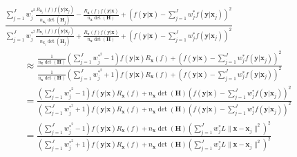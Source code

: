\documentclass[11pt]{article}
\newcommand{\Hbf}{\textbf{H}}
\newcommand{\y}{\textbf{y}}
\newcommand{\x}{\textbf{x}}
\newcommand{\wstar}{w^{\textstyle{*}}}
\newcommand{\wstarsq}{w^{\textstyle{*}^2}}
\begin{document}
\begin{align*}
  &\frac
  {
    \sum_{j=1}^J\wstarsq_j\frac{R_{\x_j}(f)f(\y|\x_j)}{n_{\x_j}\det(\Hbf_j)} 
      - \frac{R_{\x}(f)f(\y|\x)}{n_\x\det(\Hbf)}
      + \left(f(\y|\x) - \sum_{j=1}^J\wstar_jf(\y|\x_j)\right)^2
  }
  {
    \sum_{j=1}^J\wstarsq_j\frac{R_{\x_j}(f)f(\y|\x_j)}{n_{\x_j}\det(\Hbf_j)}
      + \frac{R_{\x}(f)f(\y|\x)}{n_\x\det(\Hbf)} 
      + \left(f(\y|\x) - \sum_{j=1}^J\wstar_jf(\y|\x_j)\right)^2
  } \\
  &\qquad\approx \frac
  {
    \frac{1}{n_\x\det(\Hbf)}
    \left(\sum_{j=1}^J\wstarsq_j - 1\right)f(\y|\x)R_{\x}(f)
      + \left(f(\y|\x) - \sum_{j=1}^J\wstar_jf(\y|\x_j)\right)^2
  }
  {
    \frac{1}{n_\x\det(\Hbf)}
    \left(\sum_{j=1}^J\wstarsq_j + 1\right)f(\y|\x)R_{\x}(f) 
      + \left(f(\y|\x) - \sum_{j=1}^J\wstar_jf(\y|\x_j)\right)^2
  } \\
  &\qquad= \frac
  {
    \left(\sum_{j=1}^J\wstarsq_j - 1\right)f(\y|\x)R_{\x}(f)
      + n_\x\det(\Hbf)\left(f(\y|\x) - \sum_{j=1}^J\wstar_jf(\y|\x_j)\right)^2
  }
  {
    \left(\sum_{j=1}^J\wstarsq_j + 1\right)f(\y|\x)R_{\x}(f) 
      + n_\x\det(\Hbf)\left(f(\y|\x) - \sum_{j=1}^J\wstar_jf(\y|\x_j)\right)^2
  } \\
  &\qquad= \frac
  {
    \left(\sum_{j=1}^J\wstarsq_j - 1\right)f(\y|\x)R_{\x}(f)
      + n_\x\det(\Hbf)\left(\sum_{j=1}^J\wstar_jL\|\x-\x_j\|^2\right)^2
  }
  {
    \left(\sum_{j=1}^J\wstarsq_j + 1\right)f(\y|\x)R_{\x}(f) 
      + n_\x\det(\Hbf)\left(\sum_{j=1}^J\wstar_jL\|\x-\x_j\|^2\right)^2
  }  
\end{align*}




\end{document}
